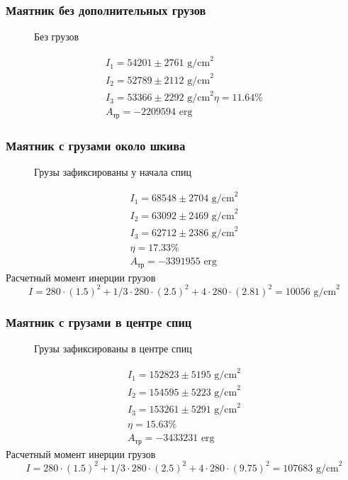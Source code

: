 \documentclass[a4paper,12pt]{article}
\begin{document}
\subsubsection{Маятник без дополнительных грузов}
\begin{figure}[H]
	\centering
	
	\caption{Без грузов}
	\label{fig:cargo-none}
\end{figure}
\begin{gather}
	I_1=54201\pm 2761 \text{ g/cm}^2\\
	I_2=52789\pm 2112 \text{ g/cm}^2\\
	I_3=53366\pm 2292 \text{ g/cm}^2
	\eta= 11.64 \%\\
	A_\text{тр}= -2209594 \text{ erg}
\end{gather}

\subsubsection{Маятник с грузами около шкива}
\begin{figure}[H]
	\centering
	
	\caption{Грузы зафиксированы у начала спиц}
	\label{fig:cargo-none}
\end{figure}
\begin{gather}
	I_1=68548\pm 2704 \text{ g/cm}^2\\
	I_2=63092\pm 2469 \text{ g/cm}^2\\
	I_3=62712\pm 2386 \text{ g/cm}^2\\
	\eta= 17.33 \%\\
	A_\text{тр}= -3391955 \text{ erg}
\end{gather}
Расчетный момент инерции грузов
\begin{equation}
	I=280\cdot(1.5)^2+1/3\cdot280\cdot(2.5)^2+4\cdot280\cdot(2.81)^2=10056\text{ g/cm}^2
\end{equation}

\subsubsection{Маятник с грузами в центре спиц}
\begin{figure}[H]
	\centering
	
	\caption{Грузы зафиксированы в центре спиц}
	\label{fig:cargo-none}
\end{figure}
\begin{gather}
	I_1=152823\pm 5195 \text{ g/cm}^2\\
	I_2=154595\pm 5223 \text{ g/cm}^2\\
	I_3=153261\pm 5291 \text{ g/cm}^2\\
	\eta= 15.63 \%\\
	A_\text{тр}= -3433231 \text{ erg}
\end{gather}
Расчетный момент инерции грузов
\begin{equation}
	I=280\cdot(1.5)^2+1/3\cdot280\cdot(2.5)^2+4\cdot280\cdot(9.75)^2=107683\text{ g/cm}^2
\end{equation}
\end{document}
